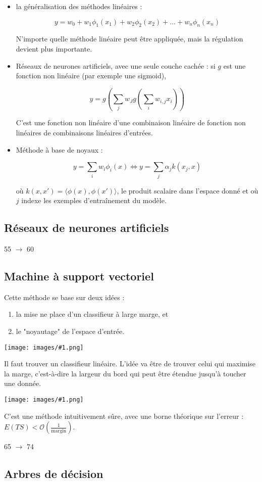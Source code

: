 \documentclass[10pt,a4paper]{report}
\newcommand{\dessin}[1]{\begin{center}\texttt{[image: images/\#1.png]}\end{center}}
\begin{document}
			\begin{itemize}
				\item la généralisation des méthodes linéaires :
				
				$$y = w_0 + w_1 \phi_1(x_1) + w_2 \phi_2(x_2) + \dots + w_n \phi_n(x_n)$$
				
				N'importe quelle méthode linéaire peut être appliquée, mais la régulation devient plus importante.
				
				\item Réseaux de neurones artificiels, avec une seule couche cachée : si $g$ est une fonction non linéaire (par exemple une sigmoid),
				
				$$y = g(\sum_j w_J g(\sum_i w_{i, j} x_i))$$
				
				C'est une fonction non linéaire d'une combinaison linéaire de fonction non linéaires de combinaisons linéaires d'entrées.
				
				\item Méthode à base de noyaux :
				
				$$y = \sum_i w_i \phi_i(x) \Leftrightarrow y = \sum_j \alpha_j k(x_j, x)$$
				
				où $k(x, x') = \langle \phi(x), \phi(x') \rangle$, le produit scalaire dans l'espace donné et où $j$ indexe les exemples d'entraînement du modèle.
			\end{itemize}
	
		\subsection{Réseaux de neurones artificiels}
		
		55 $\rightarrow$ 60
		
		\subsection{Machine à support vectoriel}
		
		Cette méthode se base sur deux idées :
		
		\begin{enumerate}
			\item la mise ne place d'un classifieur à large marge, et
			\item le "noyautage" de l'espace d'entrée.
		\end{enumerate}
		
		\dessin{14}
		Il faut trouver un classifieur linéaire. L'idée va être de trouver celui qui maximise la marge, c'est-à-dire la largeur du bord qui peut être étendue jusqu'à toucher une donnée.
		
		\dessin{15}
		
		C'est une méthode intuitivement sûre, avec une borne théorique sur l'erreur : $E(TS) < \mathcal{O}(\frac{1}{\text{margin}})$.
		
		65 $\rightarrow$ 74
		
		\subsection{Arbres de décision}
	
\end{document}
